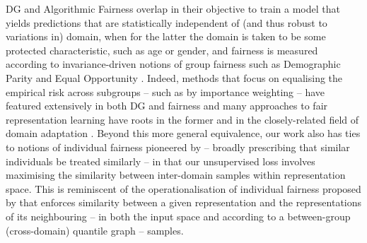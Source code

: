 DG and Algorithmic Fairness overlap in their objective to train a model that yields predictions that are
statistically independent of (and thus robust to variations in) domain, when for the latter the
domain is taken to be some protected characteristic, such as age or gender, and fairness is
measured according to invariance-driven notions of group fairness such as Demographic Parity
\citep{feldman2015certifying} and Equal Opportunity \citep{hardt2016equality}. Indeed, methods that
focus on equalising the empirical risk across subgroups -- such as by importance weighting
\citep{idrissi2022simple, shimodaira2000improving} -- have featured extensively in both DG
\citep{arjovsky2019invariant,creager2021environment,krueger2021out,sagawa2019distributionally} and
fairness \citep{agarwal2018reductions,donini2018empirical,kamiran2012data} and many approaches to
fair representation learning \citep{ creager2019flexibly,kehrenberg2020null,madras2018learning,
oneto2020exploiting,quadrianto2019discovering} have roots in the former \cite{muandet2013domain}
and in the closely-related field of domain adaptation \citep{ganin2016domain}. Beyond this more
general equivalence, our work also has ties to notions of individual fairness pioneered by
\cite{dwork2012fairness} -- broadly prescribing that similar individuals be treated similarly -- in
that our unsupervised loss involves maximising the similarity between inter-domain samples within
representation space. This is reminiscent of the operationalisation of individual fairness proposed
by \cite{lahoti2019operationalizing} that enforces similarity between a given representation and
the representations of its neighbouring -- in both the input space and according to a between-group
(cross-domain) quantile graph -- samples.

